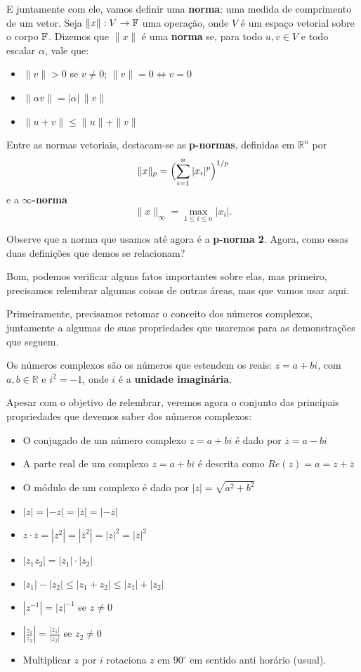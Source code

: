 \documentclass[11pt, a4paper]{article}
\begin{document}
E juntamente com ele, vamos definir uma \textbf{norma}: uma medida de comprimento de um vetor. Seja \(\|x\|:V\to \mathbb{F}\) uma operação, onde \(V\) é um espaço vetorial sobre o corpo \(\mathbb{F}\). Dizemos que \(\|x\|\) é uma \textbf{norma} se, para todo \(u,v\in V\) e todo escalar \(\alpha\), vale que:
\begin{itemize}
  \item \(\|v\|>0\) se \(v\neq0\); \(\|v\|=0\iff v=0\)
  \item \(\|\alpha v\| = |\alpha|\,\|v\|\)
  \item \(\|u+v\|\le \|u\|+\|v\|\)
\end{itemize}

Entre as normas vetoriais, destacam‑se as \textbf{p-normas}, definidas em \(\mathbb{R}^n\) por
\[
\|x\|_p = \Bigl(\sum_{i=1}^n |x_i|^p\Bigr)^{1/p}
\]
e a \textbf{\(\infty\)-norma}
\[
\|x\|_\infty = \max_{1\le i\le n} |x_i|.
\]

Observe que a norma que usamos até agora é a \textbf{p-norma 2}. Agora, como essas duas definições que demos se relacionam? 

Bom, podemos verificar alguns fatos importantes sobre elas, mas primeiro, precisamos relembrar algumas coisas de outras áreas, mas que vamos usar aqui.

Primeiramente, precisamos retomar o conceito dos números complexos, juntamente a algumas de suas propriedades que usaremos para as demonstrações que seguem.

Os números complexos são os números que estendem os reais: \(z=a+bi\), com \(a,b\in\mathbb{R}\) e \(i^2=-1\), onde \(i\) é a \textbf{unidade imaginária}.

Apesar com o objetivo de relembrar, veremos agora o conjunto das principais propriedades que devemos saber dos números complexos:

\begin{itemize}
    \item O conjugado de um número complexo \(z=a+bi\) é dado por \(\overline{z}=a-bi\)
    \item A parte real de um complexo \(z=a+bi\) é descrita como \(Re(z)=a=z + \overline{z}\)
    \item O módulo de um complexo é dado por \(|z|=\sqrt{a^2+b^2}\)
    \item \(|z|=|-z|=|\overline{z}|=|-\overline{z}|\)
    \item \(z\cdot \overline{z}=|z^2|=|\overline{z}^2|=|z|^2=|\overline{z}|^2\)
    \item \(|z_1z_2|=|z_1|\cdot|z_2|\)
    \item \(|z_1|-|z_2| \leq |z_1+z_2|\leq|z_1|+|z_2|\)
    \item \(|z^{-1}|=|z|^{-1}\) se \(z \ne 0\)
    \item \(\displaystyle\left|\frac{z_1}{z_2}\right|=\frac{|z_1|}{|z_2|}\) se \(z_2 \ne 0\)
    \item Multiplicar \(z\) por \(i\) rotaciona \(z\) em \(90^\circ\) em sentido anti horário (usual).
\end{itemize}
\end{document}
